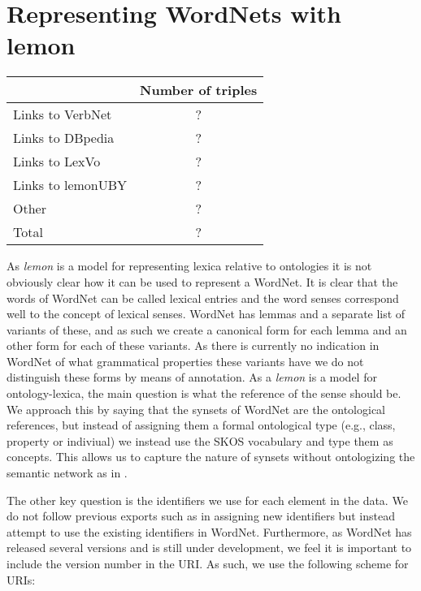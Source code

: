 \documentclass[10pt, a4paper]{article}
\newcommand{\lemon}[0]{\emph{lemon}}
\begin{document}
\section{Representing WordNets with lemon}

\begin{figure}
\end{figure}

\begin{table}
  \begin{tabular}{p{50mm}|c}
     & Number of triples \\
    \hline
    Links to VerbNet & ? \\
    Links to DBpedia & ? \\
    Links to LexVo & ? \\
    Links to lemonUBY & ? \\
    Other & ? \\
    \hline
    Total & ? \\
  \end{tabular}
\end{table}


As \lemon{} is a model for representing lexica relative to ontologies it is not
obviously clear how it can be used to represent a WordNet. It is clear that the
words of WordNet can be called lexical entries and the word senses correspond
well to the concept of lexical senses. WordNet has lemmas and a separate list of
variants of these, and as such we create a canonical form for each lemma and an
other form for each of these variants. As there is currently no indication in
WordNet of what grammatical properties these variants have we do not distinguish
these forms by means of annotation. As a \lemon{} is a model for
ontology-lexica, the main question is what the reference of the sense should be.
We approach this by saying that the synsets of WordNet are the ontological
references, but instead of assigning them a formal ontological type (e.g.,
class, property or indiviual) we instead use the SKOS\cite{} vocabulary and type
them as concepts. This allows us to capture the nature of synsets without
ontologizing the semantic network as in \cite{}. 

The other key question is the identifiers we use for each element in the data.
We do not follow previous exports such as \cite{} in assigning new identifiers
but instead attempt to use the existing identifiers in WordNet. Furthermore, as
WordNet has released several versions and is still under development, we feel it
is important to include the version number in the URI. As such, we use the
following scheme for URIs:
\end{document}
